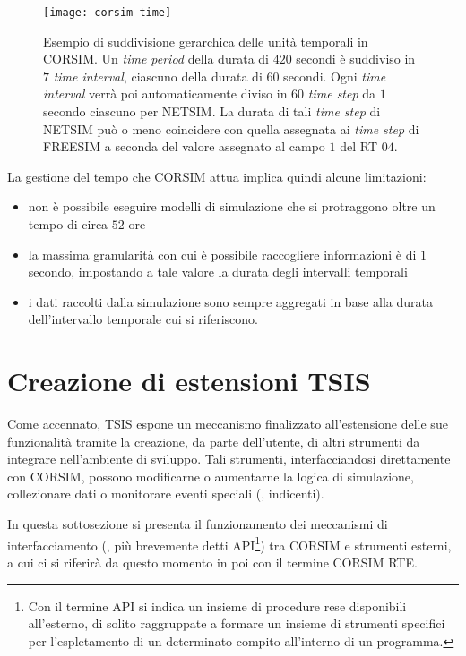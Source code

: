 \begin{figure}[ht]
\centering
\texttt{[image: corsim-time]}
\caption[Gestione del tempo in \acs{CORSIM}]{Esempio di suddivisione gerarchica delle unità temporali in \acs{CORSIM}. Un \emph{time period} della durata di $420$ secondi è suddiviso in $7$ \emph{time interval}, ciascuno della durata di $60$ secondi. Ogni \emph{time interval} verrà poi automaticamente diviso in $60$ \emph{time step} da $1$ secondo ciascuno per \acs{NETSIM}. La durata di tali \emph{time step} di \acs{NETSIM} può o meno coincidere con quella assegnata ai \emph{time step} di \acs{FREESIM} a seconda del valore assegnato al campo $1$ del \acs{RT} $04$.}
\label{fig:corsim-time}
\end{figure}

La gestione del tempo che \acs{CORSIM} attua implica quindi alcune limitazioni:
\begin{itemize}
    \item non è possibile eseguire modelli di simulazione che si protraggono oltre un tempo di circa $52$ ore
    \item la massima granularità con cui è possibile raccogliere informazioni è di $1$ secondo, impostando a tale valore la durata degli intervalli temporali
    \item i dati raccolti dalla simulazione sono sempre aggregati in base alla durata dell'intervallo temporale cui si riferiscono.
\end{itemize}

\section{Creazione di estensioni TSIS}
Come accennato, \acs{TSIS} espone un meccanismo finalizzato all'estensione delle sue funzionalità tramite la creazione, da parte dell'utente, di altri strumenti da integrare nell'ambiente di sviluppo. Tali strumenti, interfacciandosi direttamente con \acs{CORSIM}, possono modificarne o aumentarne la logica di simulazione, collezionare dati o monitorare eventi speciali (\eg{}, indicenti).

In questa sottosezione si presenta il funzionamento dei meccanismi di interfacciamento (\ie{}, più brevemente detti \acs{API}\footnote{Con il termine
\acf{API} si indica un insieme di procedure rese disponibili all'esterno, di solito raggruppate a formare un insieme di strumenti specifici per l'espletamento di un determinato compito all'interno di un programma.}) tra \acs{CORSIM} e strumenti esterni, a cui ci si riferirà da questo momento in poi con il termine \acs{CORSIM} \acs{RTE}.

